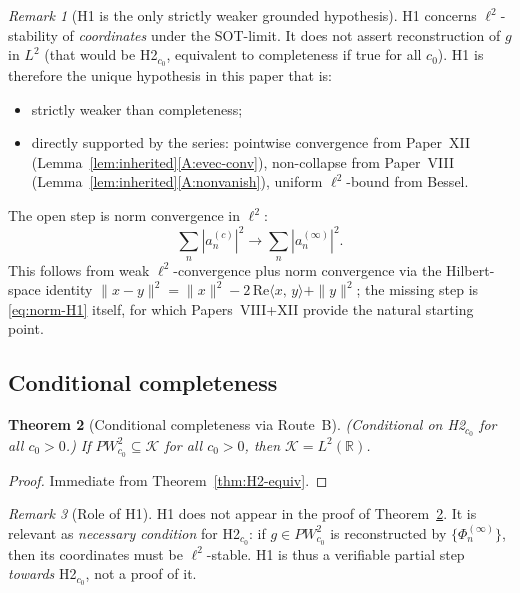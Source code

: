 \documentclass[12pt,a4paper]{amsart}
\newtheorem{theorem}{Theorem}[section]
\theoremstyle{definition}
\theoremstyle{remark}
\newtheorem{remark}[theorem]{Remark}
\newcommand{\norm}[1]{\|#1\|}
\newcommand{\ip}[2]{\langle #1,\, #2\rangle}
\newcommand{\Phiinf}[1]{\Phi_{#1}^{(\infty)}}
\newcommand{\PW}{PW}
\newcommand{\Kspace}{\mathcal{K}}
\begin{document}
\begin{remark}[H1 is the only strictly weaker grounded hypothesis]
\label{rem:H1-status}
H1 concerns $\ell^2$-stability of \emph{coordinates}
under the SOT-limit.
It does not assert reconstruction of $g$ in $L^2$
(that would be H2$_{c_0}$, equivalent to completeness
if true for all $c_0$).
H1 is therefore the unique hypothesis in this paper
that is:
\begin{itemize}
\item strictly weaker than completeness;
\item directly supported by the series:
  pointwise convergence from Paper~XII
  (Lemma~\ref{lem:inherited}\ref{A:evec-conv}),
  non-collapse from Paper~VIII
  (Lemma~\ref{lem:inherited}\ref{A:nonvanish}),
  uniform $\ell^2$-bound from Bessel.
\end{itemize}
The open step is norm convergence in $\ell^2$:
\begin{equation}\label{eq:norm-H1}
  \textstyle\sum_n|a_n^{(c)}|^2
  \to\sum_n|a_n^{(\infty)}|^2.
\end{equation}
This follows from weak $\ell^2$-convergence plus
norm convergence via the Hilbert-space identity
$\norm{x-y}^2=\norm{x}^2-2\,\mathrm{Re}\ip{x}{y}+\norm{y}^2$;
the missing step is \eqref{eq:norm-H1} itself,
for which Papers~VIII+XII provide the natural
starting point.
\end{remark}

\subsection{Conditional completeness}

\begin{theorem}[Conditional completeness via Route~B]
\label{thm:main-B}
\textup{(Conditional on H2$_{c_0}$ for all $c_0>0$.)}
If $\PW_{c_0}^2\subseteq\Kspace$ for all $c_0>0$,
then $\Kspace = L^2(\mathbb{R})$.
\end{theorem}
\begin{proof}
Immediate from Theorem~\ref{thm:H2-equiv}.
\end{proof}

\begin{remark}[Role of H1]
\label{rem:H1-role}
H1 does not appear in the proof of
Theorem~\ref{thm:main-B}.
It is relevant as \emph{necessary condition} for
H2$_{c_0}$: if $g\in\PW_{c_0}^2$ is reconstructed
by $\{\Phiinf{n}\}$, then its coordinates must be
$\ell^2$-stable.
H1 is thus a verifiable partial step
\emph{towards} H2$_{c_0}$, not a proof of it.
\end{remark}
\end{document}
